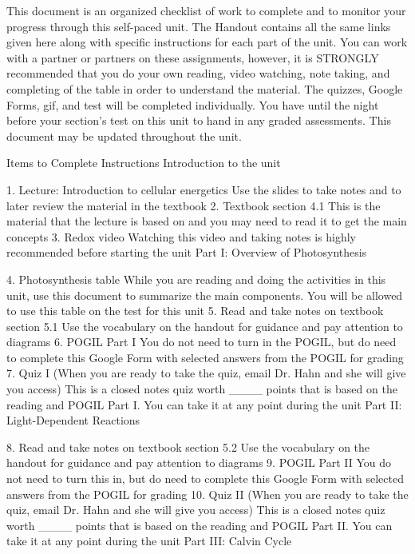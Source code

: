 ﻿This document is an organized checklist of work to complete and to monitor your progress through this self-paced unit. The Handout contains all the same links given here along with specific instructions for each part of the unit. You can work with a partner or partners on these assignments, however, it is STRONGLY recommended that you do your own reading, video watching, note taking, and completing of the table in order to understand the material. The quizzes, Google Forms, gif, and test will be completed individually. You have until the night before your section’s test on this unit to hand in any graded assessments. This document may be updated throughout the unit.


Items to Complete
	Instructions
	Introduction to the unit
	

	1. Lecture: Introduction to cellular energetics
	Use the slides to take notes and to later review the material in the textbook
	2. Textbook section 4.1 
	This is the material that the lecture is based on and you may need to read it to get the main concepts
	3. Redox video
	Watching this video and taking notes is highly recommended before starting the unit
	Part I: Overview of Photosynthesis
	

	4. Photosynthesis table
	While you are reading and doing the activities in this unit, use this document to summarize the main components. You will be allowed to use this table on the test for this unit
	5. Read and take notes on textbook section 5.1
	Use the vocabulary on the handout for guidance and pay attention to diagrams
	6. POGIL Part I
	You do not need to turn in the POGIL, but do need to complete this Google Form with selected answers from the POGIL for grading
	7. Quiz I (When you are ready to take the quiz, email Dr. Hahn and she will give you access)
	This is a closed notes quiz worth ____ points that is based on the reading and POGIL Part I. You can take it at any point during the unit
	Part II: Light-Dependent Reactions 
	

	8. Read and take notes on textbook section 5.2
	Use the vocabulary on the handout for guidance and pay attention to diagrams
	9. POGIL Part II
	You do not need to turn this in, but do need to complete this Google Form with selected answers from the POGIL for grading
	10. Quiz II (When you are ready to take the quiz, email Dr. Hahn and she will give you access)
	This is a closed notes quiz worth ____ points that is based on the reading and POGIL Part II. You can take it at any point during the unit
	Part III: Calvin Cycle
	

